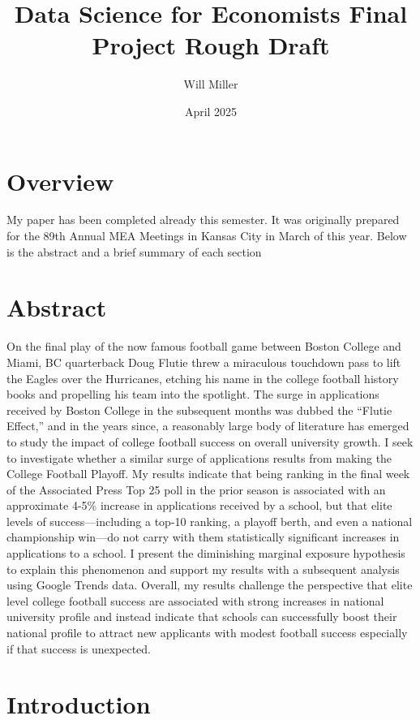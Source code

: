 \documentclass{article}
\title{Data Science for Economists Final Project Rough Draft}
\author{Will Miller}
\date{April 2025}
\begin{document}
\maketitle

\section{Overview}

My paper has been completed already this semester. It was originally prepared for the 89th Annual MEA Meetings in Kansas City in March of this year. Below is the abstract and a brief summary of each section

\section{Abstract}
On the final play of the now famous football game between Boston College and Miami, BC quarterback Doug Flutie threw a miraculous touchdown pass to lift the Eagles over the Hurricanes, etching his name in the college football history books and propelling his team into the spotlight. The surge in applications received by Boston College in the subsequent months was dubbed the “Flutie Effect,” and in the years since, a reasonably large body of literature has emerged to study the impact of college football success on overall university growth. I seek to investigate whether a similar surge of applications results from making the College Football Playoff. My results indicate that being ranking in the final week of the Associated Press Top 25 poll in the prior season is associated with an approximate 4-5\% increase in applications received by a school, but that elite levels of success—including a top-10 ranking, a playoff berth, and even a national championship win—do not carry with them statistically significant increases in applications to a school. I present the diminishing marginal exposure hypothesis to explain this phenomenon and support my results with a subsequent analysis using Google Trends data. Overall, my results challenge the perspective that elite level college football success are associated with strong increases in national university profile and instead indicate that schools can successfully boost their national profile to attract new applicants with modest football success especially if that success is unexpected. 

\section{Introduction}
\end{document}
